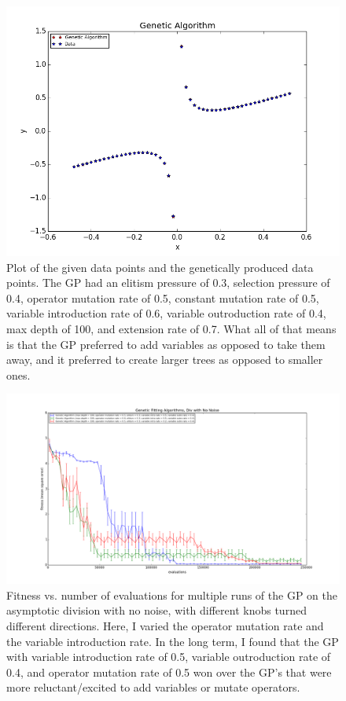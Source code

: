 \documentclass[11pt,amsmath,amssymb]{revtex4}
\begin{document}
\begin{figure}[H]
\center
\includegraphics[scale=0.55]{Div_No_Noise.png}
\caption{Plot of the given data points and the genetically produced data points. The GP had an elitism pressure of 0.3, selection pressure of 0.4, operator mutation rate of 0.5, constant mutation rate of 0.5, variable introduction rate of 0.6, variable outroduction rate of 0.4, max depth of 100, and extension rate of 0.7. What all of that means is that the GP preferred to add variables as opposed to take them away, and it preferred to create larger trees as opposed to smaller ones.}
\label{q1}
\end{figure}

\begin{figure}[H]
\center
\includegraphics[scale=0.4]{Div_No_Noise_Comparison.png}
\caption{Fitness vs. number of evaluations for multiple runs of the GP on the asymptotic division with no noise, with different knobs turned different directions. Here, I varied the operator mutation rate and the variable introduction rate. In the long term, I found that the GP with variable introduction rate of 0.5, variable outroduction rate of 0.4, and operator mutation rate of 0.5 won over the GP's that were more reluctant/excited to add variables or mutate operators.}
\label{q1}
\end{figure}
\end{document}
